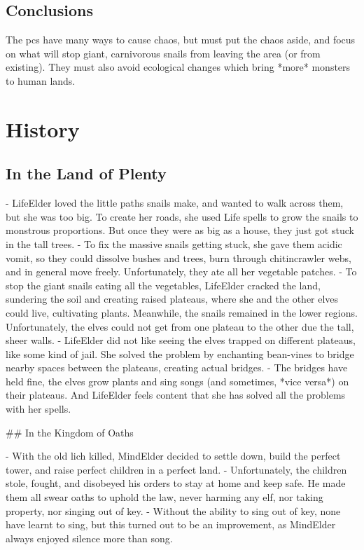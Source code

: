 \subsection{Conclusions}

The \glspl{pc} have many ways to cause chaos, but must put the chaos aside, and focus on what will stop giant, carnivorous snails from leaving the area (or from existing).
They must also avoid ecological changes which bring *more* monsters to human lands.

\section{History}

\subsection{In the Land of Plenty}

- LifeElder loved the little paths snails make, and wanted to walk across them, but she was too big.  To create her roads, she used Life spells to grow the snails to monstrous proportions.  But once they were as big as a house, they just got stuck in the tall trees.
- To fix the massive snails getting stuck, she gave them acidic vomit, so they could dissolve bushes and trees, burn through \gls{chitincrawler} webs, and in general move freely.  Unfortunately, they ate all her vegetable patches.
- To stop the giant snails eating all the vegetables, LifeElder cracked the land, sundering the soil and creating raised plateaus, where she and the other elves could live, cultivating plants.  Meanwhile, the snails remained in the lower regions.  Unfortunately, the elves could not get from one plateau to the other due the tall, sheer walls.
- LifeElder did not like seeing the elves trapped on different plateaus, like some kind of jail.  She solved the problem by enchanting bean-vines to bridge nearby spaces between the plateaus, creating actual bridges.
- The bridges have held fine, the elves grow plants and sing songs (and sometimes, *vice versa*) on their plateaus.  And LifeElder feels content that she has solved all the problems with her spells.

## In the Kingdom of Oaths

- With the old lich killed, MindElder decided to settle down, build the perfect tower, and raise perfect children in a perfect land.
- Unfortunately, the children stole, fought, and disobeyed his orders to stay at home and keep safe.  He made them all swear oaths to uphold the law, never harming any elf, nor taking property, nor singing out of key.
- Without the ability to sing out of key, none have learnt to sing, but this turned out to be an improvement, as MindElder always enjoyed silence more than song.

